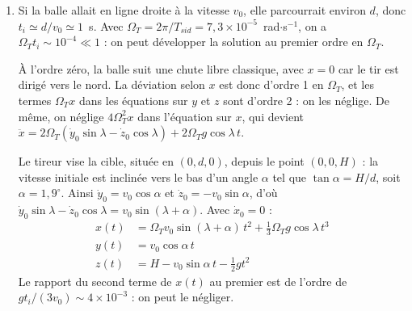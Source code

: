 \begin{correction}
\begin{enumerate}
	\textit{On peut demander à l'élève si, la solution contenant un terme périodique, la balle revient à son point de départ au bout d'une demi-journée. Ce n'est pas le cas, même dans le cadre du modèle. D'abord, $x(t)$ contient le terme $\frac{g\cos\lambda}{2\Omega_T}t$, qui croît sans limite. Ensuite, l'équation $\frac{\dif\vec{v}}{\dif t}=\vec{g}-2\vec{\Omega}_T\wedge\vec{v}$ est celle d'une charge dans des champs $\vec{E}$ et $\vec{B}$ croisés, avec $q\vec{E}/m\to\vec{g}$ et $q\vec{B}/m\to2\vec{\Omega}_T$. Le long de $\vec{\Omega}_T$, la force de Coriolis n'agit pas et la composante $-g\sin\lambda$ de la pesanteur donne une chute uniformément accélérée. Perpendiculairement à $\vec{\Omega}_T$, la balle décrit un cercle à la pulsation $2\Omega_T$, entraîné par la dérive $\frac{\vec{g}\wedge\vec{\Omega}_T}{2\Omega_T^2}=\frac{g\cos\lambda}{2\Omega_T}\vec{e}_x$, analogue à la dérive $\vec{E}\wedge\vec{B}/B^2$. La trajectoire est une cycloïde dérivant vers l'est à environ 42~km$\cdot$s$^{-1}$, vitesse qui dépasse celle de libération et montre que le modèle n'a plus de sens à ces échelles. Un vrai retour à l'expéditeur serait une orbite, de période fixée par la gravitation et non par la rotation de la Terre.}

	\item Si la balle allait en ligne droite à la vitesse $v_0$, elle parcourrait environ $d$, donc $t_i\simeq d/v_0\simeq1$~s. Avec $\Omega_T=2\pi/T_{sid}=7{,}3\times10^{-5}$~rad$\cdot$s$^{-1}$, on a $\Omega_Tt_i\sim10^{-4}\ll1$ : on peut développer la solution au premier ordre en $\Omega_T$.

	À l'ordre zéro, la balle suit une chute libre classique, avec $x=0$ car le tir est dirigé vers le nord. La déviation selon $x$ est donc d'ordre 1 en $\Omega_T$, et les termes $\Omega_Tx$ dans les équations sur $y$ et $z$ sont d'ordre 2 : on les néglige. De même, on néglige $4\Omega_T^2x$ dans l'équation sur $x$, qui devient $\ddot{x}=2\Omega_T(\dot{y}_0\sin\lambda-\dot{z}_0\cos\lambda)+2\Omega_Tg\cos\lambda\,t$.

	Le tireur vise la cible, située en $(0,d,0)$, depuis le point $(0,0,H)$ : la vitesse initiale est inclinée vers le bas d'un angle $\alpha$ tel que $\tan\alpha=H/d$, soit $\alpha=1{,}9^\circ$. Ainsi $\dot{y}_0=v_0\cos\alpha$ et $\dot{z}_0=-v_0\sin\alpha$, d'où $\dot{y}_0\sin\lambda-\dot{z}_0\cos\lambda=v_0\sin(\lambda+\alpha)$. Avec $\dot{x}_0=0$ :
	\begin{align*}
		x(t)&=\Omega_Tv_0\sin(\lambda+\alpha)\,t^2+\frac{1}{3}\Omega_Tg\cos\lambda\,t^3\\
		y(t)&=v_0\cos\alpha\,t \\
		z(t)&=H-v_0\sin\alpha\,t-\frac{1}{2}gt^2
	\end{align*}
	Le rapport du second terme de $x(t)$ au premier est de l'ordre de $gt_i/(3v_0)\sim4\times10^{-3}$ : on peut le négliger.


\end{enumerate}
\end{correction}
